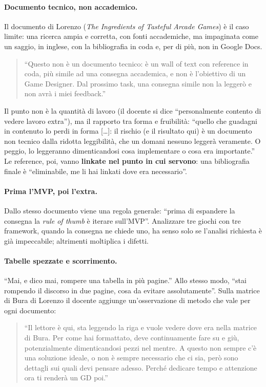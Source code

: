 \paragraph{Documento tecnico, non accademico.} Il documento di Lorenzo
(\emph{The Ingredients of Tasteful Arcade Games}) è il caso limite: una
ricerca ampia e corretta, con fonti accademiche, ma impaginata come un
saggio, in inglese, con la bibliografia in coda e, per di più, non in Google
Docs.
\begin{quote}
  ``Questo non è un documento tecnico: è un wall of text con reference in
  coda, più simile ad una consegna accademica, e non è l'obiettivo di un Game
  Designer. Dal prossimo task, una consegna simile non la leggerò e non avrà
  i miei feedback.''
\end{quote}
Il punto non è la quantità di lavoro (il docente si dice ``personalmente
contento di vedere lavoro extra''), ma il rapporto tra forma e fruibilità:
``quello che guadagni in contenuto lo perdi in forma [\dots]: il rischio (e il
risultato qui) è un documento non tecnico dalla ridotta leggibilità, che un
domani nessuno leggerà veramente. O peggio, lo leggeranno dimenticandosi cosa
implementare o cosa era importante.'' Le reference, poi, vanno
\textbf{linkate nel punto in cui servono}: una bibliografia finale è
``eliminabile, me li hai linkati dove era necessario''.

\paragraph{Prima l'MVP, poi l'extra.} Dallo stesso documento viene una regola
generale: ``prima di espandere la consegna la \emph{rule of thumb} è iterare
sull'MVP''. Analizzare tre giochi con tre framework, quando la consegna ne
chiede uno, ha senso solo se l'analisi richiesta è già impeccabile; altrimenti
moltiplica i difetti.

\paragraph{Tabelle spezzate e scorrimento.} ``Mai, e dico mai, rompere una
tabella in più pagine.'' Allo stesso modo, ``stai rompendo il discorso in due
pagine, cosa da evitare assolutamente''. Sulla matrice di Bura di Lorenzo il
docente aggiunge un'osservazione di metodo che vale per ogni documento:
\begin{quote}
  ``Il lettore è qui, sta leggendo la riga e vuole vedere dove era nella
  matrice di Bura. Per come hai formattato, deve continuamente fare su e giù,
  potenzialmente dimenticandosi pezzi nel mentre. A questo non sempre c'è una
  soluzione ideale, o non è sempre necessario che ci sia, però sono dettagli
  sui quali devi pensare adesso. Perché dedicare tempo e attenzione ora ti
  renderà un GD poi.''
\end{quote}

